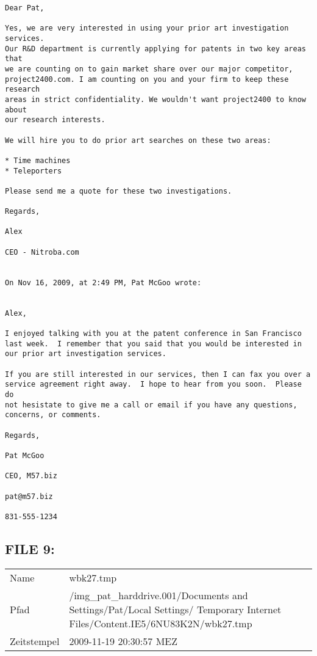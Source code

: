 \begin{lstlisting}
Dear Pat,

Yes, we are very interested in using your prior art investigation services. 
Our R&D department is currently applying for patents in two key areas that 
we are counting on to gain market share over our major competitor, 
project2400.com. I am counting on you and your firm to keep these research 
areas in strict confidentiality. We wouldn't want project2400 to know about 
our research interests.

We will hire you to do prior art searches on these two areas:

* Time machines
* Teleporters

Please send me a quote for these two investigations.

Regards,

Alex

CEO - Nitroba.com


On Nov 16, 2009, at 2:49 PM, Pat McGoo wrote:


Alex,

I enjoyed talking with you at the patent conference in San Francisco
last week.  I remember that you said that you would be interested in
our prior art investigation services.

If you are still interested in our services, then I can fax you over a
service agreement right away.  I hope to hear from you soon.  Please do
not hesistate to give me a call or email if you have any questions,
concerns, or comments.

Regards,

Pat McGoo

CEO, M57.biz

pat@m57.biz

831-555-1234
\end{lstlisting}

\subsection{FILE 9:}	

\begin{table}[htb]
	\begin{tabular}{p{2cm} p{13.5cm}}
		Name & wbk27.tmp\\
		Pfad & /img_pat_harddrive.001/Documents and Settings/Pat/Local Settings/ Temporary Internet Files/Content.IE5/6NU83K2N/wbk27.tmp\\
		Zeitstempel & 2009-11-19 20:30:57 MEZ
	\end{tabular}
\end{table}	

